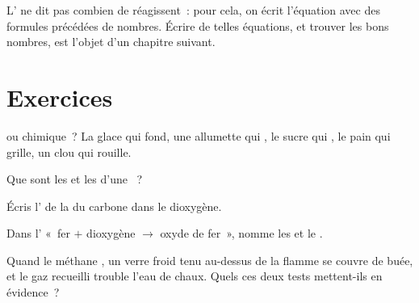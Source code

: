 \begin{remark}\label{rem:g7:chemical-reactions:counting}
L' ne dit pas combien de  réagissent~: pour
cela, on écrit l'équation avec des formules précédées de nombres. Écrire
de telles équations, et trouver les bons nombres, est l'objet d'un
chapitre suivant.
\end{remark}

\section{Exercices}

\begin{exercise}[$\star$]\label{exo:g7:chemical-reactions:1}
 ou chimique~? La glace qui fond, une allumette
qui , le sucre qui , le pain qui grille, un clou qui
rouille.
\end{exercise}

\begin{exercise}[$\star$]\label{exo:g7:chemical-reactions:2}
Que sont les  et les  d'une ~?
\end{exercise}

\begin{exercise}[$\star$]\label{exo:g7:chemical-reactions:3}
Écris l' de la  du carbone dans le dioxygène.
\end{exercise}

\begin{exercise}[$\star$]\label{exo:g7:chemical-reactions:4}
Dans l' «~fer $+$ dioxygène $\longrightarrow$ oxyde de
fer~», nomme les  et le .
\end{exercise}

\begin{exercise}[$\star\star$]\label{exo:g7:chemical-reactions:5}
Quand le méthane , un verre froid tenu au-dessus de la flamme se
couvre de buée, et le gaz recueilli trouble l'eau de chaux. Quels
 ces deux tests mettent-ils en évidence~?
\end{exercise}


